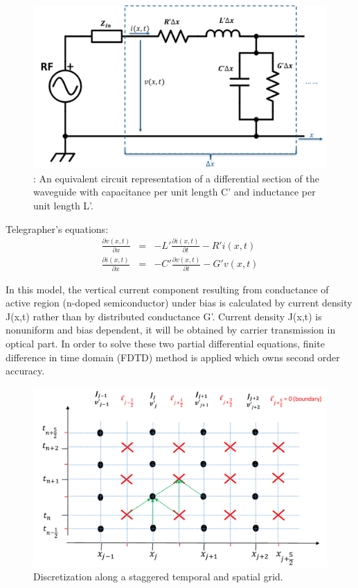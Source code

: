 \documentclass[11pt,final]{scrbook}
\begin{document}
\begin{figure}[htbp]
\begin{center}
\includegraphics[scale=0.4]{TLcircuit}
\caption{: An equivalent circuit representation of a differential section of the waveguide with capacitance per unit length C’ and inductance per unit length L’.}
\label{fig:TLcircuit}
\end{center}
\end{figure}
Telegrapher's equations:
\begin{eqnarray}
\frac { \partial v(x,t) }{ \partial x }  &=& -L'\frac { \partial i(x,t) }{ \partial t }-R'i(x,t) \label{eq:TLequation1}\\
\frac { \partial i(x,t) }{ \partial x }  &=& - C'\frac { \partial v(x,t) }{ \partial t }-G'v(x,t) \label{eq:TLequation2}
\end{eqnarray}

In this model, the vertical current component resulting from conductance of active region (n-doped semiconductor) under bias is calculated by current density J(x,t) rather than by distributed conductance G'. Current density J(x,t) is nonuniform and bias dependent, it will be obtained by carrier transmission in optical part. In order to solve these two partial differential equations, finite difference in time domain (FDTD) method is applied which owns second order accuracy.

\begin{figure}[htbp]
\begin{center}
\includegraphics[scale=0.6]{Discretization}
\caption{Discretization along a staggered temporal and spatial grid.}
\label{fig:Discretisation}
\end{center}
\end{figure}
\end{document}
